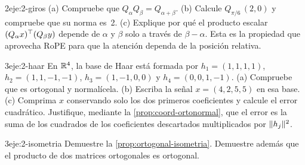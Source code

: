 \begin{ejercicio}{2}{eje:2-giros}
(a) Compruebe que $Q_\alpha Q_\beta=Q_{\alpha+\beta}$. (b) Calcule $Q_{\pi/6}\,(2,0)$ y compruebe que su norma es~2. (c) Explique por qué el producto escalar $(Q_{\alpha}x)^{\top}(Q_{\beta}y)$ depende de $\alpha$ y $\beta$ solo a través de $\beta-\alpha$. Esta es la propiedad que aprovecha RoPE para que la atención dependa de la posición relativa.
\end{ejercicio}

\begin{ejercicio}{3}{eje:2-haar}
En $\mathbb{R}^{4}$, la base de Haar está formada por $h_1=(1,1,1,1)$, $h_2=(1,1,-1,-1)$, $h_3=(1,-1,0,0)$ y $h_4=(0,0,1,-1)$. (a) Compruebe que es ortogonal y normalícela. (b) Escriba la señal $x=(4,2,5,5)$ en esa base. (c) Comprima $x$ conservando solo los dos primeros coeficientes y calcule el error cuadrático. Justifique, mediante la \cref{prop:coord-ortonormal}, que el error es la suma de los cuadrados de los coeficientes descartados multiplicados por $\lVert h_j\rVert^{2}$.
\end{ejercicio}

\begin{ejercicio}{3}{eje:2-isometria}
Demuestre la \cref{prop:ortogonal-isometria}. Demuestre además que el producto de dos matrices ortogonales es ortogonal.
\end{ejercicio}
